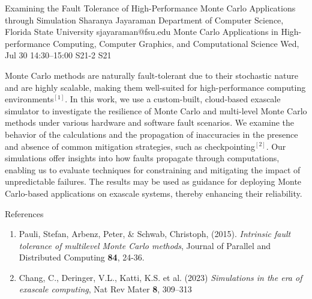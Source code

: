 \begin{talk}
  {Examining the Fault Tolerance of High-Performance Monte Carlo Applications through Simulation}%
  {Sharanya Jayaraman}%
  {Department of Computer Science, Florida State University}%
  {sjayaraman@fsu.edu}%
  {Monte Carlo Applications in High-performance Computing, Computer Graphics, and Computational Science}%
  {}%
  {Wed, Jul 30 14:30--15:00}%
  {S21-2}%
  {S21}%
   
Monte Carlo methods are naturally fault-tolerant due to their stochastic nature and are highly scalable, making them well-suited for high-performance computing environments$^{[1]}$. In this work, we use a custom-built, cloud-based exascale simulator to investigate the resilience of Monte Carlo and multi-level Monte Carlo methods under various hardware and software fault scenarios. We examine the behavior of the calculations and the propagation of inaccuracies in the presence and absence of common mitigation strategies, such as checkpointing$^{[2]}$. Our simulations offer insights into how faults propagate through computations, enabling us to evaluate techniques for constraining and mitigating the impact of unpredictable failures. The results may be used as guidance for deploying Monte Carlo-based applications on exascale systems, thereby enhancing their reliability.

\medskip

References
\begin{enumerate}
 \item[{[1]}] Pauli, Stefan, Arbenz, Peter, \&  Schwab, Christoph, (2015). {\it Intrinsic fault tolerance of multilevel Monte Carlo methods}, Journal of Parallel and Distributed Computing \textbf{84}, 24-36.
 \item[{[2]}] Chang, C., Deringer, V.L., Katti, K.S. et al. (2023) {\it Simulations in the era of exascale computing}, Nat Rev Mater \textbf{8}, 309--313 
\end{enumerate}

\end{talk}

